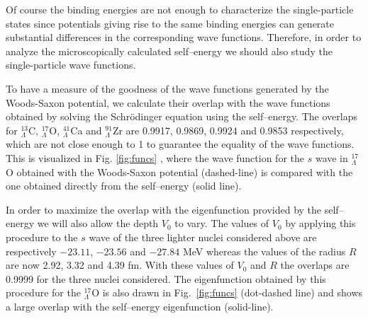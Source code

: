 Of course the binding energies are not enough to characterize the
single-particle states since potentials giving rise to the same binding
energies can generate substantial differences in the corresponding
wave functions. Therefore, in order to analyze the microscopically
calculated self--energy we should also study the single-particle wave
functions.

 To have a measure of the goodness of the wave
functions generated by the Woods-Saxon potential,  we calculate their 
overlap with the wave functions obtained by solving the
Schr\"odinger equation using the self--energy. The overlaps for
$^{13}_{\Lambda}$C, 
$^{17}_{\Lambda}$O, $^{41}_{\Lambda}$Ca and $^{91}_{\Lambda}$Zr are  0.9917,
0.9869, 0.9924 and 0.9853 respectively, which 
 are not close enough to 1 to guarantee
the equality of the wave functions. 
This is visualized in Fig. \ref{fig:funcs} , where the wave
function
for the $s$ wave in $^{17}_{\Lambda}$O obtained with the Woods-Saxon potential
(dashed-line) is compared with the one obtained directly from the
self--energy (solid line).

In order to
maximize
the overlap with the eigenfunction provided by the self--energy we
will also allow the depth
$V_0$ to vary. The
values of $V_0$ by applying this procedure to the $s$ wave of the three lighter
nuclei considered 
 above are respectively $-23.11$, $-23.56$ and $-27.84$ MeV
whereas the values of the radius $R$ are now 2.92, 3.32 and 4.39 fm.
With these
values of $V_0$ and $R$ the overlaps are 0.9999 for the three nuclei
considered. The eigenfunction obtained by this procedure for
 the $^{17}_{\Lambda}$O is
also drawn in Fig.\ \ref{fig:funcs} (dot-dashed line) and shows a
large overlap with the self--energy eigenfunction (solid-line).

